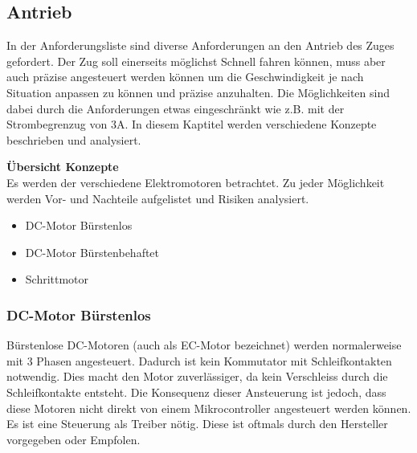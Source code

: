 \documentclass[../../../main.tex]{subfiles}
\begin{document}
    \subsection{Antrieb}
    In der Anforderungsliste sind diverse Anforderungen an den Antrieb des Zuges gefordert.
    Der Zug soll einerseits möglichst Schnell fahren können, muss aber auch präzise angesteuert werden können um die Geschwindigkeit je nach Situation anpassen zu können und präzise anzuhalten.
    Die Möglichkeiten sind dabei durch die Anforderungen etwas eingeschränkt wie z.B. mit der Strombegrenzug von 3A.
    In diesem Kaptitel werden verschiedene Konzepte beschrieben und analysiert.

    \textbf{Übersicht Konzepte}\\
    Es werden der verschiedene Elektromotoren betrachtet. Zu jeder Möglichkeit werden Vor- und Nachteile aufgelistet und Risiken analysiert.

    \begin{itemize}
        \item DC-Motor Bürstenlos
        \item DC-Motor Bürstenbehaftet
        \item Schrittmotor
    \end{itemize}

    \subsubsection{DC-Motor Bürstenlos}

    Bürstenlose DC-Motoren (auch als EC-Motor bezeichnet) werden normalerweise mit 3 Phasen angesteuert. Dadurch ist kein Kommutator mit Schleifkontakten notwendig. Dies macht den Motor zuverlässiger, da kein Verschleiss durch die Schleifkontakte entsteht.
    Die Konsequenz dieser Ansteuerung ist jedoch, dass diese Motoren nicht direkt von einem Mikrocontroller angesteuert werden können. Es ist eine Steuerung als Treiber nötig. Diese ist oftmals durch den Hersteller vorgegeben oder Empfolen.
\end{document}
